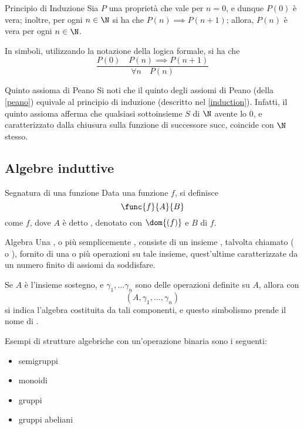 \documentclass[a4paper, 12pt]{report}
\begin{document}
    \begin{framedprinc}[label={induction}]{Principio di Induzione}
        Sia $P$ una proprietà che vale per $n = 0$, e dunque $P(0)$ è vera; inoltre,  per ogni $n \in \N$ si ha che $P(n) \implies P(n + 1)$; allora, $P(n)$ è vera per ogni $n \in \N$.

        In simboli, utilizzando la notazione della logica formale, si ha che $$\dfrac{P(0) \quad P(n) \implies P(n + 1)}{\forall n \quad P(n)}$$
    \end{framedprinc}

    \begin{framedobs}{Quinto assioma di Peano}
        Si noti che il quinto degli assiomi di Peano (della \cref{peano}) equivale al principio di induzione (descritto nel \cref{induction}). Infatti, il quinto assioma afferma che qualsiasi sottoinsieme $S$ di $\N$ avente lo 0, e caratterizzato dalla chiusura sulla funzione di successore $\mathrm{succ}$, coincide con $\N$ stesso.
    \end{framedobs}

    \subsection{Algebre induttive}

    \begin{frameddefn}{Segnatura di una funzione}
        Data una funzione $f$, si definisce $$\func{f}{A}{B}$$ come  $f$, dove $A$ è detto , denotato con $\dom{(f)}$ e $B$  di $f$.
    \end{frameddefn}

    \begin{frameddefn}{Algebra}
        Una , o più semplicemente , consiste di un insieme , talvolta chiamato  ( o ), fornito di una o più operazioni su tale insieme, quest'ultime caratterizzate da un numero finito di assiomi da soddisfare.

        Se $A$ è l'insieme sostegno, e $\gamma_1, \ldots \gamma_n$ sono delle operazioni definite su $A$, allora con $$(A, \gamma_1, \ldots, \gamma_n)$$ si indica l'algebra costituita da tali componenti, e questo simbolismo prende il nome di .
    \end{frameddefn}

    \begin{example}
        Esempi di strutture algebriche con un'operazione binaria sono i seguenti:

        \begin{itemize}
            \item semigruppi
            \item monoidi
            \item gruppi
            \item gruppi abeliani
        \end{itemize}
    \end{example}
\end{document}
